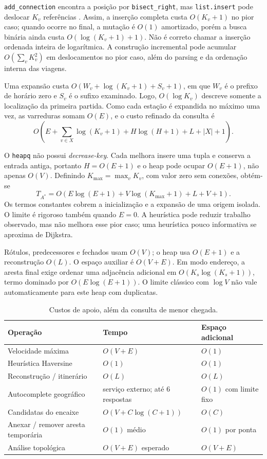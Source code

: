 \documentclass[12pt]{article}
\newcommand{\code}[1]{\texttt{#1}}
\begin{document}
\code{add\_connection} encontra a posição por \code{bisect\_right}, mas \code{list.insert} pode deslocar $K_v$ referências \cite{python}. Assim, a inserção completa custa $O(K_v+1)$ no pior caso; quando ocorre no final, a mutação é $O(1)$ amortizado, porém a busca binária ainda custa $O(\log(K_v+1)+1)$. Não é correto chamar a inserção ordenada inteira de logarítmica. A construção incremental pode acumular $O(\sum_v K_v^2)$ em deslocamentos no pior caso, além do parsing e da ordenação interna das viagens.

Uma expansão custa $O(W_v+\log(K_v+1)+S_v+1)$, em que $W_v$ é o prefixo de horário zero e $S_v$ é o sufixo examinado. Logo, $O(\log K_v)$ descreve somente a localização da primeira partida. Como cada estação é expandida no máximo uma vez, as varreduras somam $O(E)$, e o custo refinado da consulta é
\begin{equation}
O\left(E+\sum_{v\in X}\log(K_v+1)+H\log(H+1)+L+|X|+1\right).
\end{equation}

O \code{heapq} não possui \emph{decrease-key}. Cada melhora insere uma tupla e conserva a entrada antiga, portanto $H=O(E+1)$ e o heap pode ocupar $O(E+1)$, não apenas $O(V)$. Definindo $K_{\max}=\max_v K_v$, com valor zero sem conexões, obtém-se
\begin{equation}
T_{A^*}=O\left(E\log(E+1)+V\log(K_{\max}+1)+L+V+1\right).
\end{equation}
Os termos constantes cobrem a inicialização e a expansão de uma origem isolada. O limite é rigoroso também quando $E=0$. A heurística pode reduzir trabalho observado, mas não melhora esse pior caso; uma heurística pouco informativa se aproxima de Dijkstra.

Rótulos, predecessores e fechados usam $O(V)$; o heap usa $O(E+1)$ e a reconstrução $O(L)$. O espaço auxiliar é $O(V+E)$. Em modo endereço, a aresta final exige ordenar uma adjacência adicional em $O(K_s\log(K_s+1))$, termo dominado por $O(E\log(E+1))$. O limite clássico com $\log V$ não vale automaticamente para este heap com duplicatas.

\begin{table}[ht]
\centering
\caption{Custos de apoio, além da consulta de menor chegada.}
\begin{tabularx}{\textwidth}{@{}lXX@{}}
\toprule Operação & Tempo & Espaço adicional \\
\midrule
Velocidade máxima & $O(V+E)$ & $O(1)$ \\
Heurística Haversine & $O(1)$ & $O(1)$ \\
Reconstrução / itinerário & $O(L)$ & $O(L)$ \\
Autocomplete geográfico & serviço externo; até 6 respostas & $O(1)$ com limite fixo \\
Candidatas do encaixe & $O(V+C\log(C+1))$ & $O(C)$ \\
Anexar / remover aresta temporária & $O(1)$ médio & $O(1)$ por ponta \\
Análise topológica & $O(V+E)$ esperado & $O(V+E)$ \\
\bottomrule
\end{tabularx}
\end{table}
\end{document}
